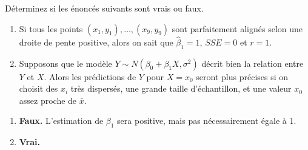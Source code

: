 \begin{exercice}
Déterminez si les énoncés suivants sont vrais ou faux.
\begin{enumerate}[label=(\alph*)]
  \item Si tous les points $(x_1,y_1),\dots,(x_9,y_9)$ sont parfaitement alignés selon une
  droite de pente positive, alors on sait que $\hat\beta_1=1$, $SSE=0$ et $r=1$.
  \item Supposons que le modèle $Y\sim N(\beta_0+\beta_1X,\sigma^2)$ décrit bien la relation
  entre $Y$ et $X$. Alors les prédictions de $Y$ pour $X=x_0$ seront plus précises si on
  choisit des $x_i$ très dispersés, une grande taille d'échantillon, et une valeur $x_0$
  assez proche de $\bar x$.
\end{enumerate}
\begin{solution}
\begin{enumerate}[label=(\alph*)]
  \item \textbf{Faux.} L'estimation de $\beta_1$ sera positive, mais pas nécessairement
  égale à 1.
  \item \textbf{Vrai.}
\end{enumerate}
\end{solution}
\end{exercice}


